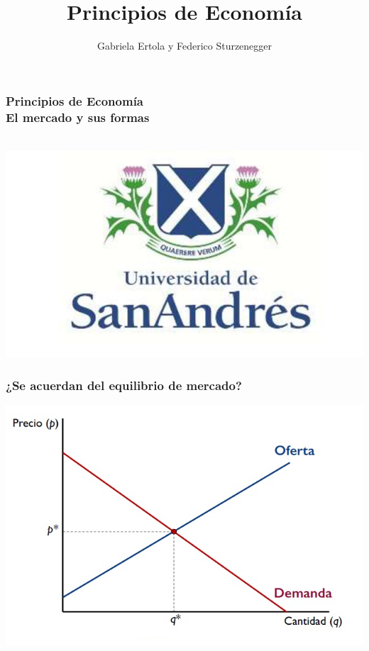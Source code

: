 \documentclass{beamer}
\title[Principios de Economía]{Principios de Economía}
\date{}
\author[Ertola y Sturzenegger]{Gabriela Ertola y Federico Sturzenegger }
\institute[]{Universidad de San Andrés \\
2022}
\begin{document}
\begin{frame}
\frametitle{Principios de Economía
\centering
\\ \vspace{12mm} El mercado y sus formas}
\centering
 \\ \vspace{12mm} %
\includegraphics[scale=0.25]{Figures/logoUDESA.jpg} 
\end{frame}


\begin{frame}
\frametitle{¿Se acuerdan del equilibrio de mercado?}
\includegraphics[scale=0.6]{Figures/Tema_07.3_equilibrioofertademanda_0.jpg}
\end{frame}
\end{document}
